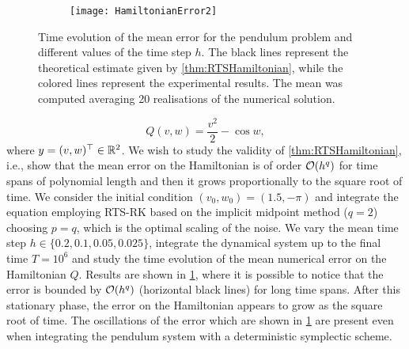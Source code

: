 \documentclass[10pt]{article}
\begin{document}
\begin{figure}[t]
	\begin{center}
	\begin{subfigure}{0.7\linewidth}
	\texttt{[image: HamiltonianError2]} 
	\end{subfigure}
	\begin{subfigure}{0.14\linewidth}
	\end{subfigure}
	\end{center}

	\caption{Time evolution of the mean error for the pendulum problem and different values of the time step $h$. The black lines represent the theoretical estimate given by \cref{thm:RTSHamiltonian}, while the colored lines represent the experimental results. The mean was computed averaging 20 realisations of the numerical solution.}
	\label{fig:MeanTime}	
\end{figure}
\begin{equation}
Q(v, w) = \frac{v^2}{2} - \cos w,
\end{equation}
where $y = (v, w)^\top \in \mathbb{R}^2$. We wish to study the validity of \cref{thm:RTSHamiltonian}, i.e., show that the mean error on the Hamiltonian is of order $\mathcal{O}(h^q)$ for time spans of polynomial length and then it grows proportionally to the square root of time. We consider the initial condition $(v_0, w_0) = (1.5, -\pi)$ and integrate the equation employing RTS-RK based on the implicit midpoint method ($q = 2$) choosing $p = q$, which is the optimal scaling of the noise. We vary the mean time step $h \in \{0.2, 0.1, 0.05, 0.025\}$, integrate the dynamical system up to the final time $T = 10^6$ and study the time evolution of the mean numerical error on the Hamiltonian $Q$. Results are shown in \cref{fig:MeanTime}, where it is possible to notice that the error is bounded by $\mathcal{O}(h^q)$ (horizontal black lines) for long time spans. After this stationary phase, the error on the Hamiltonian appears to grow as the square root of time. The oscillations of the error which are shown in \cref{fig:MeanTime} are present even when integrating the pendulum system with a deterministic symplectic scheme. 
\end{document}
